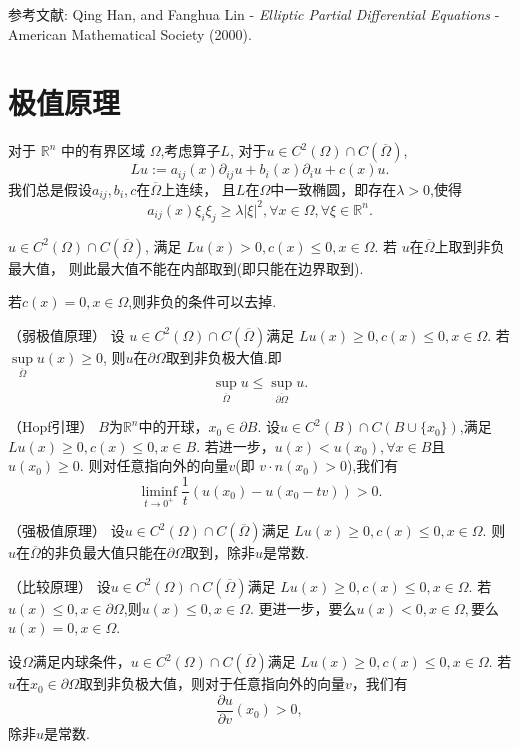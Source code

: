 参考文献: Qing Han, and Fanghua Lin - \textit{Elliptic Partial Differential Equations} - American Mathematical Society (2000).


\section{极值原理}
对于 $\mathbb{R}^n$ 中的有界区域 $\Omega$,考虑算子$L$,
对于$u\in C^2(\Omega)\cap C(\overline{\Omega})$, 
$$Lu:=a_{ij}(x)\partial_{ij}u+b_{i}(x)\partial_{i}u+c(x)u.$$
我们总是假设$a_{ij},b_{i},c$在$\overline{\Omega}$上连续，
且$L$在$\Omega$中一致椭圆，即存在$\lambda>0$,使得
$$a_{ij}(x)\xi_i\xi_j\geq \lambda \vert \xi\vert ^2,
\forall x\in \Omega, \forall \xi \in \mathbb{R}^n.$$

\begin{lemma}
    $u\in C^2(\Omega)\cap C(\overline{\Omega})$,
    满足 $Lu(x)>0,c(x)\leq 0,x\in \Omega$.
    若 $u$在$\overline{\Omega}$上取到非负最大值，
    则此最大值不能在内部取到(即只能在边界取到).
\end{lemma}

\begin{remark}
    若$c(x)=0,x\in \Omega$,则非负的条件可以去掉.
\end{remark}


\begin{theorem}（弱极值原理）
设 $u\in C^2(\Omega)\cap C(\overline{\Omega})$满足
$Lu(x)\geq 0,c(x)\leq 0,x\in \Omega$.
若$\sup\limits_{\overline{\Omega}} u(x)\geq0$,
则$u$在$\partial \Omega$取到非负极大值.即
$$\sup_{\overline{\Omega}}u\leq \sup_{\overline{\partial\Omega}}u.$$

\end{theorem}
\begin{lemma}（Hopf引理）
$B$为$\mathbb{R}^n$中的开球，$x_0\in\partial B$. 
设$u\in C^2(B)\cap C(B\cup \{x_0\})$,满足$Lu(x)\geq 0,c(x)\leq 0,x\in B$.
若进一步，$u(x)<u(x_0),\forall x\in B$且$u(x_0)\geq 0$.
则对任意指向外的向量$v$(即 $v\cdot n(x_0)>0$),我们有
$$ \liminf_{t\rightarrow 0^+}\frac{1}{t}(u(x_0)-u(x_0-tv))>0.$$

\end{lemma} 
\begin{theorem}（强极值原理）
设$u\in C^2(\Omega)\cap C(\overline{\Omega})$满足
$Lu(x)\geq 0, c(x)\leq 0,x\in \Omega$.
则$u$在$\overline{\Omega}$的非负最大值只能在$\partial \Omega$取到，除非$u$是常数.

\end{theorem} 
\begin{corollary}（比较原理）
设$u\in C^2(\Omega)\cap C(\overline{\Omega})$满足
$Lu(x)\geq 0, c(x)\leq 0,x\in \Omega$.
若$u(x)\leq 0,x\in \partial \Omega$,则$u(x)\leq 0,x\in \Omega$.
更进一步，要么$u(x)<0,x\in \Omega,$要么$u(x)=0,x\in \Omega$.

\end{corollary}
\begin{corollary}
    设$\Omega $满足内球条件，$u\in C^2(\Omega)\cap C(\overline{\Omega})$满足
    $Lu(x)\geq 0, c(x)\leq 0,x\in \Omega$.
    若$u$在$x_0\in \partial \Omega$取到非负极大值，则对于任意指向外的向量$v$，我们有
    $$ \frac{\partial u}{\partial v}(x_0)>0,$$
    除非$u$是常数.
\end{corollary}

